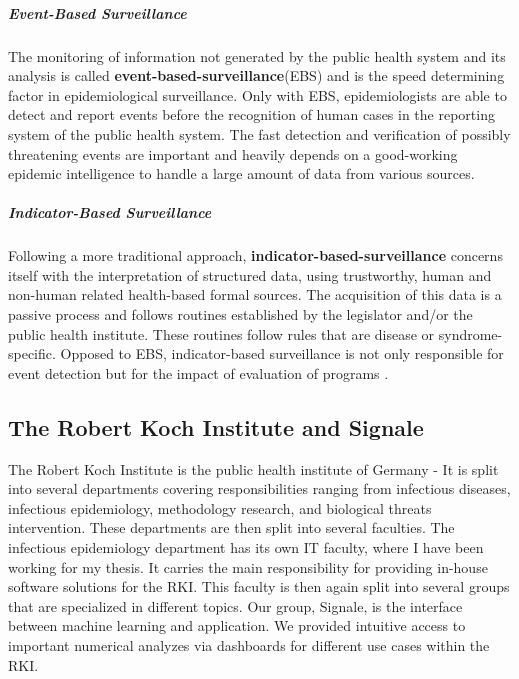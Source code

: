 \subparagraph{Event-Based Surveillance}
The monitoring of information not generated by the public health system and its analysis is called \textbf{event-based-surveillance}(\gls{EBS}) and is the speed determining factor in epidemiological surveillance. Only with EBS, epidemiologists are able to detect and report events before the recognition of human cases in the reporting system of the public health system\cite{EarlyDetection}. The fast detection and verification of possibly threatening events are important and heavily depends on a good-working epidemic intelligence to handle a large amount of data from various sources.

\subparagraph{Indicator-Based Surveillance}
Following a more traditional approach, \textbf{indicator-based-surveillance} concerns itself with the interpretation of structured data, using trustworthy, human and non-human related health-based formal sources\cite{EarlyDetection}. The acquisition of this data is a passive process and follows routines established by the legislator and/or the public health institute. These routines follow rules that are disease or syndrome-specific. Opposed to EBS, indicator-based surveillance is not only responsible for event detection but for the impact of evaluation of programs \cite{EarlyDetection}.


\subsection{The Robert Koch Institute and Signale}
The Robert Koch Institute is the public health institute of Germany - It is
split into several departments covering responsibilities ranging from infectious diseases, infectious epidemiology, methodology research, and biological threats intervention.
These departments are then split into several faculties. The infectious epidemiology department has its own IT faculty,
where I have been working for my thesis. It carries the main responsibility for providing in-house software solutions for the RKI. This faculty is then again split into several groups that are specialized in different topics.
Our group, Signale, is the interface between machine learning and application.
We provided intuitive access to important numerical analyzes via dashboards for different use cases within the RKI.

